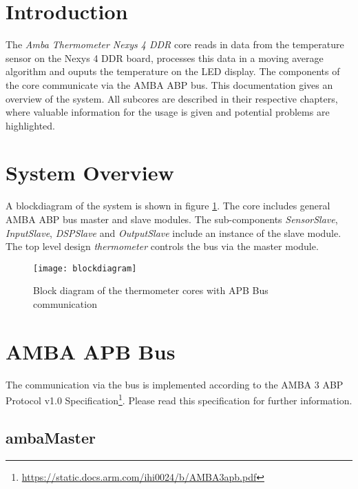 \documentclass[%
	a4paper,
]
{article}
\begin{document}

\section{Introduction}


The \textit{Amba Thermometer Nexys 4 DDR} core reads in data from the temperature sensor on the Nexys 4 DDR board, processes this data in a moving average algorithm and ouputs the temperature on the LED display. The components of the core communicate via the AMBA ABP bus.
\newline
This documentation gives an overview of the system. All subcores are described in their respective chapters, where valuable information for the usage is given and potential problems are highlighted.


\section{System Overview}

A blockdiagram of the system is shown in figure \ref{fig:block}. The core includes general AMBA ABP bus master and slave modules. The sub-components \textit{SensorSlave}, \textit{InputSlave}, \textit{DSPSlave} and \textit{OutputSlave} include an instance of the slave module. The top level design \textit{thermometer} controls the bus via the master module. 
\newline
\newline
\begin{figure}[h!]
	\centering
	\texttt{[image: blockdiagram]}
	\caption{Block diagram of the thermometer cores with APB Bus communication}
	\label{fig:block}
\end{figure}

\section{AMBA APB Bus}
The communication via the bus is implemented according to the AMBA 3 ABP Protocol v1.0 Specification\footnote{\url{https://static.docs.arm.com/ihi0024/b/AMBA3apb.pdf}}. Please read this specification for further information.

\subsection{ambaMaster}
\end{document}
